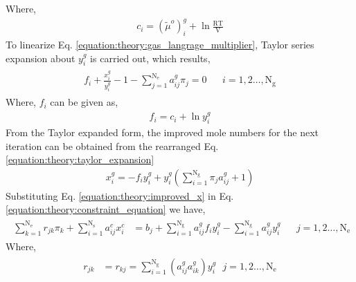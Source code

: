\documentclass[letterpaper,10pt,english]{sphinxmanual}
\begin{document}
Where,
\begin{equation}\label{equation:theory:c_i}
\begin{split}c_i = {\left(\tilde{\mu}^o\right)}_i^g + \ln\mathrm{\frac{RT}{V}}\end{split}
\end{equation}
To linearize Eq. \eqref{equation:theory:gas_langrage_multiplier}, Taylor series
expansion about \(y_{i}^{g}\) is carried out, which results,
\begin{equation}\label{equation:theory:taylor_expansion}
\begin{split}\begin{align}
f_i + \frac{x_i^g}{y_i^g} - 1 - \sum_{j=1}^{\mathrm{N_e}}a_{ij}^{g}\pi_j
= 0             &&i = 1,2\ldots,\mathrm{N_g}
\end{align}\end{split}
\end{equation}
Where, \(f_{i}\) can be given as,
\begin{equation}\label{equation:theory:fi}
\begin{split}f_i = c_i + \ln y_i^g\end{split}
\end{equation}
From the Taylor expanded form, the improved mole numbers for the next
iteration can be obtained from the rearranged Eq. \eqref{equation:theory:taylor_expansion}
\begin{equation}\label{equation:theory:improved_x}
\begin{split}x_i^g = -f_i y_i^g + y_i^g
\left(\sum_{i=1}^{\mathrm{N_g}} \pi _{j} a_{ij}^{g} + 1\right)\end{split}
\end{equation}
Substituting Eq. \eqref{equation:theory:improved_x} in Eq. \eqref{equation:theory:constraint_equation} we have,
\begin{equation}\label{equation:theory:r_matrix_equation}
\begin{split}\begin{align}
\sum_{k=1}^{\mathrm{N_e}} r_{jk} \pi_k
+ \sum_{i=1}^{\mathrm{N_s}} a_{ij}^{c}x_{i}^{c} & = b_j
+ \sum_{i=1}^{\mathrm{N_g}} a_{ij}^{g} f_i y_i^g
- \sum_{i=1}^{\mathrm{N_g}}a_{ij}^{g}y_i^g      &&j= 1,2\ldots, \mathrm{N_e}
\end{align}\end{split}
\end{equation}
Where,
\begin{equation}\label{equation:theory:r_ij}
\begin{split}\begin{align}
r_{jk} & = r_{kj} = \sum_{i=1}^{\mathrm{N_g}}
(a_{ij}^{g}a_{ik}^{g})y_{i}^{g} \text{          }j = 1, 2\ldots, \mathrm{N_e}
\end{align}\end{split}
\end{equation}
\end{document}
